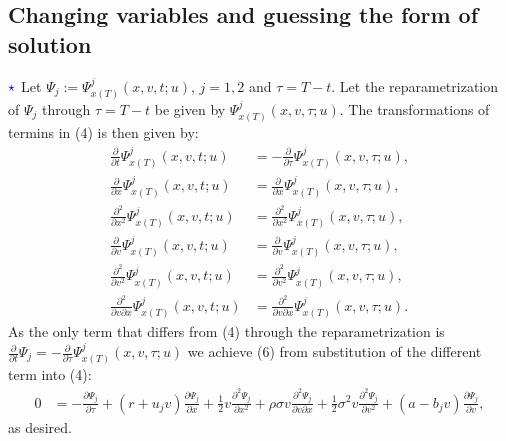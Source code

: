 \documentclass[12pt]{article}
\numberwithin{equation}{section}
\begin{document}
\subsection{Changing variables and guessing the form of solution}
$\textcolor{blue}{\star}$ Let $\Psi_j:=\Psi_{x(T)}^j(x,v,t;u)$, $j=1,2$ and $\tau=T-t$. Let the
reparametrization of $\Psi_j$ through $\tau=T-t$ be given by
$\Psi_{x(T)}^j(x,v,\tau;u)$. The transformations of termins in (4) is then given
by:
\begin{align*}
    \frac{\partial }{\partial t}\Psi_{x(T)}^j(x,v,t;u)&=-\frac{\partial }{\partial \tau}\Psi_{x(T)}^j(x,v,\tau;u),\\
    \frac{\partial }{\partial x}\Psi_{x(T)}^j(x,v,t;u)&=\frac{\partial }{\partial x}\Psi_{x(T)}^j(x,v,\tau;u),\\
    \frac{\partial^2 }{\partial x^2}\Psi_{x(T)}^j(x,v,t;u)&=\frac{\partial ^2}{\partial x^2}\Psi_{x(T)}^j(x,v,\tau;u),\\
    \frac{\partial }{\partial v}\Psi_{x(T)}^j(x,v,t;u)&=\frac{\partial }{\partial v}\Psi_{x(T)}^j(x,v,\tau;u),\\
    \frac{\partial^2 }{\partial v^2}\Psi_{x(T)}^j(x,v,t;u)&=\frac{\partial^2 }{\partial v^2}\Psi_{x(T)}^j(x,v,\tau;u),\\
    \frac{\partial^2 }{\partial v \partial x}\Psi_{x(T)}^j(x,v,t;u)&=\frac{\partial^2 }{\partial v \partial x}\Psi_{x(T)}^j(x,v,\tau;u).
\end{align*}
As the only term that differs from (4) through the reparametrization is
$\frac{\partial }{\partial t}\Psi_j=-\frac{\partial }{\partial
\tau}\Psi_{x(T)}^j(x,v,\tau;u)$ we achieve (6) from substitution of the
different term into (4):
\begin{align*}
    0&=-\frac{\partial \Psi_j}{\partial \tau}+(r+u_jv)\frac{\partial \Psi_j}{\partial x}+
    \frac{1}{2}v\frac{\partial^2 \Psi_j}{\partial x^2}+\rho\sigma v \frac{\partial^2 \Psi_j}{\partial v \partial x}+
    \frac{1}{2}\sigma^2v \frac{\partial^2 \Psi_j}{\partial v^2}+(a-b_j v) \frac{\partial \Psi_j}{\partial v},
\end{align*}
as desired.
\end{document}
